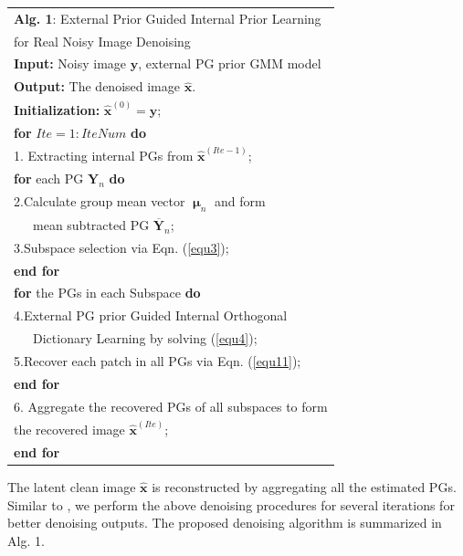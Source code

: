 \documentclass[10pt,twocolumn,letterpaper]{article}
\begin{document}
\begin{table}\label{alg1}
\begin{tabular}{l}
\hline
\textbf{Alg. 1}: External Prior Guided Internal Prior Learning
\\
\quad \quad \quad for Real Noisy Image Denoising
\\
\hline
\textbf{Input:} Noisy image $\mathbf{y}$, external PG prior GMM model
\\
\textbf{Output:} The denoised image $\hat{\mathbf{x}}$.
\\
\textbf{Initialization:} $\hat{\mathbf{x}}^{(0)}=\mathbf{y}$;
\\
\textbf{for} $Ite = 1:IteNum$ \textbf{do}
\\
1. Extracting internal PGs from $\hat{\mathbf{x}}^{(Ite-1)}$;
\\
\quad\textbf{for} each PG $\mathbf{Y}_{n}$ \textbf{do}
\\
2.\quad Calculate group mean vector $\boldsymbol{\upmu}_{n}$ and form 
\\
\quad \ \ \ mean subtracted PG $\mathbf{\overline{Y}}_{n}$;
\\
3.\quad Subspace selection via Eqn. (\ref{equ3});
\\
\quad\textbf{end for}
\\
\quad\textbf{for} the PGs in each Subspace \textbf{do}
\\
4.\quad External PG prior Guided Internal Orthogonal
\\
\quad \ \ \ Dictionary Learning by solving (\ref{equ4});
\\
5.\quad Recover each patch in all PGs via Eqn. (\ref{equ11});
\\
\quad\textbf{end for}
\\
6. Aggregate the recovered PGs of all subspaces to form
\\
\quad the recovered image $\hat{\mathbf{x}}^{(Ite)}$;
\\
\textbf{end for}
\\
\hline
\end{tabular}
\end{table}
The latent clean image $\hat{\mathbf{x}}$ is reconstructed by aggregating all the estimated PGs. Similar to \cite{pgpd}, we perform the above denoising procedures for several iterations for better denoising outputs. The proposed denoising algorithm is summarized in Alg. 1.
\end{document}
